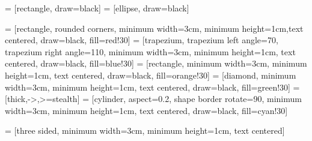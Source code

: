 \newcommand{\para}{\newline	\hspace*{1cm}}

\DeclareMathOperator*{\argmax}{arg\,max}
\DeclarePairedDelimiter{\floor}{\lfloor}{\rfloor}
\DeclarePairedDelimiter{\ceil}{\lceil}{\rceil}
\DeclareMathOperator*{\argmin}{arg\,min}
\newcommand{\+}[1]{\ensuremath{\mathbf{#1}}}
\newcommand{\declarecommand}[1]{\providecommand{#1}{}\renewcommand{#1}} 

 = [rectangle, draw=black]
 = [ellipse, draw=black]

 = [rectangle, rounded corners, minimum width=3cm, minimum height=1cm,text centered, draw=black, fill=red!30]
 = [trapezium, trapezium left angle=70, trapezium right angle=110, minimum width=3cm, minimum height=1cm, text centered, draw=black, fill=blue!30]
 = [rectangle, minimum width=3cm, minimum height=1cm, text centered, draw=black, fill=orange!30]
 = [diamond, minimum width=3cm, minimum height=1cm, text centered, draw=black, fill=green!30]
 = [thick,->,>=stealth]
 = [cylinder, aspect=0.2, shape border rotate=90, minimum width=3cm, minimum height=1cm, text centered, draw=black, fill=cyan!30]

 = [three sided, minimum width=3cm, minimum height=1cm, text centered]
\newcommand{\fref}[2]{\hyperref[#2]{#1~\ref{#2}}}